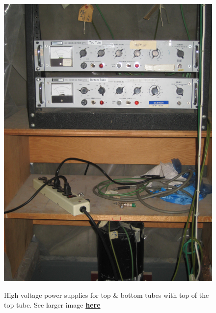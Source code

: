 \documentclass{../lab}
\begin{document}
\begin{figure}[h]
\begin{minipage}{0.24\textwidth}
    \href{http://experimentationlab.berkeley.edu/sites/default/files/images/MUO_Pwr_3562.jpg}{\includegraphics[width=\linewidth,keepaspectratio]{images/MUO_Pwr_3562.jpg}}
    \caption{High voltage power supplies for top & bottom tubes with top of the top tube. See larger image \href{http://experimentationlab.berkeley.edu/sites/default/files/images/MUO_Pwr_3562.jpg}{\textbf{here}}}
\end{minipage}
\begin{minipage}{0.24\textwidth}

\end{minipage}
\end{figure}
\end{document}
